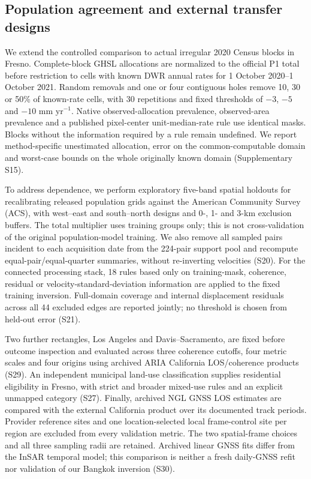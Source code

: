 \subsection{Population agreement and external transfer designs}
We extend the controlled comparison to actual irregular 2020 Census blocks in Fresno. Complete-block GHSL allocations are normalized to the official P1 total before restriction to cells with known DWR annual rates for 1 October 2020--1 October 2021. Random removals and one or four contiguous holes remove 10, 30 or 50\% of known-rate cells, with 30 repetitions and fixed thresholds of $-3$, $-5$ and $-10$ mm yr$^{-1}$. Native observed-allocation prevalence, observed-area prevalence and a published pixel-center unit-median-rate rule use identical masks. Blocks without the information required by a rule remain undefined. We report method-specific unestimated allocation, error on the common-computable domain and worst-case bounds on the whole originally known domain (Supplementary S15).

To address dependence, we perform exploratory five-band spatial holdouts for recalibrating released population grids against the American Community Survey (ACS), with west--east and south--north designs and 0-, 1- and 3-km exclusion buffers. The total multiplier uses training groups only; this is not cross-validation of the original population-model training. We also remove all sampled pairs incident to each acquisition date from the 224-pair support pool and recompute equal-pair/equal-quarter summaries, without re-inverting velocities (S20). For the connected processing stack, 18 rules based only on training-mask, coherence, residual or velocity-standard-deviation information are applied to the fixed training inversion. Full-domain coverage and internal displacement residuals across all 44 excluded edges are reported jointly; no threshold is chosen from held-out error (S21).

Two further rectangles, Los Angeles and Davis--Sacramento, are fixed before outcome inspection and evaluated across three coherence cutoffs, four metric scales and four origins using archived ARIA California LOS/coherence products \citep{sangha2026california,sangha2026data} (S29). An independent municipal land-use classification supplies residential eligibility in Fresno, with strict and broader mixed-use rules and an explicit unmapped category \citep{fresno2026landuse} (S27). Finally, archived NGL GNSS LOS estimates are compared with the external California product over its documented track periods. Provider reference sites and one location-selected local frame-control site per region are excluded from every validation metric. The two spatial-frame choices and all three sampling radii are retained. Archived linear GNSS fits differ from the InSAR temporal model; this comparison is neither a fresh daily-GNSS refit nor validation of our Bangkok inversion (S30).
